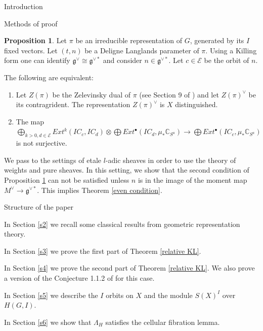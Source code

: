 \documentclass[12pt]{article}
\newcommand{\C}{\mathbb{C}}
\newcommand{\<}{\langle}
\renewcommand{\>}{\rangle}
\theoremstyle{plain}
\theoremstyle{definition}
\newtheorem{prop}[theorem]{Proposition}
\begin{document}
\begin{section}{Introduction}
\begin{subsection}{Methods of proof}
\begin{prop}\label{short sheaf condition}
    Let $\pi$ be an irreducible representation of $G$, generated by its $I$ fixed vectors. Let $(t,n)$ be a Deligne Langlands parameter of $\pi$. Using a Killing form one can identify $\mathfrak{g^\vee}\cong\mathfrak{g}^{\vee*}$ and consider $n\in \mathfrak{g}^{\vee*}$. Let $c\in\mathcal{E}$ be the orbit of $n$.

    The following are equivalent:

    \begin{enumerate}
        \item Let $Z(\pi)$ be the Zelevinsky dual of $\pi$ (see Section 9 of \cite{Zelevinsky1980}) and let $Z(\pi)^\vee$ be its contragrident. The representation $Z(\pi)^\vee$ is $X$ distinguished. 
        \item The map $\bigoplus_{k>0,d\in\mathcal{E}}Ext^k(IC_c,IC_d)\otimes \bigoplus Ext^{\bullet}(IC_d,\mu_*\C_{S^a})\rightarrow\bigoplus Ext^\bullet(IC_c,\mu_*\C_{S^a})$ is not surjective.
    \end{enumerate}
    
\end{prop}


We pass to the settings of etale $l$-adic sheaves in order to use the theory of weights and pure sheaves. In this setting, we show that the second condition of Proposition \ref{short sheaf condition} can not be satisfied unless $n$ is in the image of the moment map $M^\vee\rightarrow \mathfrak{g}^{\vee*}$. This implies Theorem \ref{even condition}.



\end{subsection}


\begin{subsection}{Structure of the paper}

In Section \ref{s2} we recall some classical results from geometric representation theory.

In Section \ref{s3} we prove the first part of Theorem \ref{relative KL}.


In Section \ref{s4} we prove the second part of Theorem \ref{relative KL}. We also prove a version of the Conjecture 1.1.2 of \cite{finkelberg2023lagrangiansubvarietieshypersphericalvarieties} for this case.

In Section \ref{s5} we describe the $I$ orbits on $X$ and the module $S(X)^I$ over $H(G,I)$.

In Section \ref{s6} we show that $\Lambda_H$ satisfies the cellular fibration lemma.


\end{subsection}
\end{section}
\end{document}
